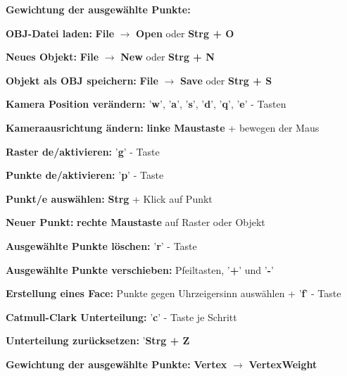 	\begin{labeling}[]{\textbf{Gewichtung der ausgewählte Punkte:}}%
		\item [\textbf{OBJ-Datei laden:}] \textbf{File} $\rightarrow$ \textbf{Open} oder \textbf{Strg + O}
		\item [\textbf{Neues Objekt:}] \textbf{File} $\rightarrow$ \textbf{New} oder \textbf{Strg + N}
		\item [\textbf{Objekt als OBJ speichern:}] \textbf{File} $\rightarrow$ \textbf{Save} oder \textbf{Strg + S}
		\newline
		\item [\textbf{Kamera Position verändern:}] '\textbf{w}',  '\textbf{a}', '\textbf{s}', '\textbf{d}', '\textbf{q}', '\textbf{e}' - Tasten
		\item [\textbf{Kameraausrichtung ändern:}] \textbf{linke Maustaste} + bewegen der Maus
		\newline
		\item [\textbf{Raster de/aktivieren:}] '\textbf{g}' - Taste
		\item [\textbf{Punkte de/aktivieren:}] '\textbf{p}' - Taste
		\newline
		\item [\textbf{Punkt/e auswählen:}] \textbf{Strg} + Klick auf Punkt
		\item [\textbf{Neuer Punkt:}] \textbf{rechte Maustaste} auf Raster oder Objekt
		\item [\textbf{Ausgewählte Punkte löschen:}] '\textbf{r}' - Taste
		\item [\textbf{Ausgewählte Punkte verschieben:}] Pfeiltasten, '\textbf{+}' und  '\textbf{-}'
		\newline
		\item [\textbf{Erstellung eines Face:}] Punkte gegen Uhrzeigersinn auswählen +  '\textbf{f}' - Taste
		\newline
		\item [\textbf{Catmull-Clark Unterteilung:}]  '\textbf{c}' - Taste je Schritt
		\item [\textbf{Unterteilung zurücksetzen:}] '\textbf{Strg + Z}
		\newline
		\item [\textbf{Gewichtung der ausgewählte Punkte:}] \textbf{Vertex} $\rightarrow$ \textbf{VertexWeight}
	\end{labeling}
		
